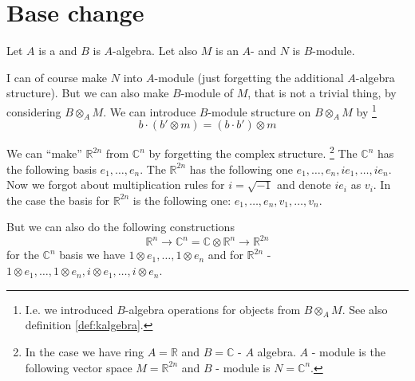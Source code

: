 \section{Base change}

Let $A$ is a  and $B$ is $A$-algebra. Let also $M$
is an $A$- and $N$ is $B$-module.

I can of course make $N$ into $A$-module (just forgetting the
additional $A$-algebra structure). But we can also make $B$-module of
$M$, that is not a trivial thing, by considering $B \otimes_A M$.
We can introduce $B$-module structure on $B \otimes_A M$ by
\footnote{
  I.e. we introduced $B$-algebra operations for objects from
  $B \otimes_A M$. See also definition \ref{def:kalgebra}.
}
\[
b \cdot \left(b' \otimes m \right) = \left( b \cdot b' \right) \otimes m 
\]

\begin{example}
  We can ``make'' $\mathbb{R}^{2n}$ from $\mathbb{C}^n$ by forgetting
  the complex structure.
  \footnote{
    In the case we have ring $A = \mathbb{R}$ and $B = \mathbb{C}$ -
    $A$ algebra. $A$ - module is the following vector space
    $M = \mathbb{R}^{2n}$ and $B$ - module is $N = \mathbb{C}^n$.
  }
  The $\mathbb{C}^n$ has the following basis $e_1, \dots, e_n$.
  The $\mathbb{R}^{2n}$ has the following one
  $e_1, \dots, e_n, i e_1, \dots, i e_n$. Now we forgot about
  multiplication rules for $i = \sqrt{-1}$ and denote $i e_i$ as
  $v_i$. In the case the basis for $\mathbb{R}^{2n}$ is the following
  one: $e_1, \dots, e_n, v_1, \dots, v_n$.

  But we can also do the following constructions
  \[
  \mathbb{R}^n \rightarrow
  \mathbb{C}^n = \mathbb{C} \otimes \mathbb{R}^n \rightarrow
  \mathbb{R}^{2n}
  \]
  for the $\mathbb{C}^n$ basis we have
  $1 \otimes e_1, \dots, 1 \otimes e_n$ and for $\mathbb{R}^{2n}$ -
  $1 \otimes e_1, \dots, 1 \otimes e_n, i \otimes e_1, \dots, i
  \otimes e_n$.
\end{example}

